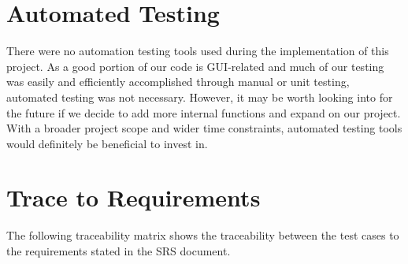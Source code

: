 \documentclass[12pt, titlepage]{article}
\begin{document}
\section{Automated Testing}
There were no automation testing tools used during the implementation of this project. As a good portion of our code is GUI-related and much of our testing was easily and efficiently accomplished through manual or unit testing, automated testing was not necessary. However, it may be worth looking into for the future if we decide to add more internal functions and expand on our project. With a broader project scope and wider time constraints, automated testing tools would definitely be beneficial to invest in. 

\section{Trace to Requirements}
The following traceability matrix shows the traceability between the test cases to the requirements stated in the SRS document.
\end{document}
